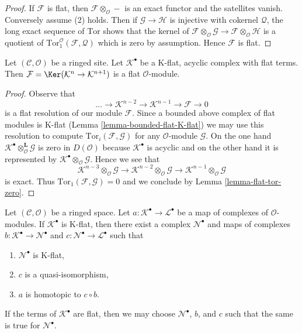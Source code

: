 \begin{proof}
If $\mathcal{F}$ is flat, then $\mathcal{F} \otimes_\mathcal{O} -$
is an exact functor and the satellites vanish. Conversely assume (2)
holds. Then if $\mathcal{G} \to \mathcal{H}$ is injective with cokernel
$\mathcal{Q}$, the long exact sequence of $\text{Tor}$ shows that
the kernel of
$\mathcal{F} \otimes_\mathcal{O} \mathcal{G} \to
\mathcal{F} \otimes_\mathcal{O} \mathcal{H}$
is a quotient of
$\text{Tor}_1^\mathcal{O}(\mathcal{F}, \mathcal{Q})$
which is zero by assumption. Hence $\mathcal{F}$ is flat.
\end{proof}

\begin{lemma}
\label{lemma-K-flat-flat-acyclic}
Let $(\mathcal{C}, \mathcal{O})$ be a ringed site. Let $\mathcal{K}^\bullet$
be a K-flat, acyclic complex with flat terms. Then
$\mathcal{F} = \Ker(\mathcal{K}^n \to \mathcal{K}^{n + 1})$
is a flat $\mathcal{O}$-module.
\end{lemma}

\begin{proof}
Observe that
$$
\ldots \to \mathcal{K}^{n - 2} \to \mathcal{K}^{n - 1} \to
\mathcal{F} \to 0
$$
is a flat resolution of our module $\mathcal{F}$. Since a bounded above complex
of flat modules is K-flat (Lemma \ref{lemma-bounded-flat-K-flat})
we may use this resolution to compute
$\text{Tor}_i(\mathcal{F}, \mathcal{G})$ for any
$\mathcal{O}$-module $\mathcal{G}$. On the one hand
$\mathcal{K}^\bullet \otimes_\mathcal{O}^\mathbf{L} \mathcal{G}$
is zero in $D(\mathcal{O})$ because $\mathcal{K}^\bullet$ is acyclic
and on the other hand it is represented by
$\mathcal{K}^\bullet \otimes_\mathcal{O} \mathcal{G}$.
Hence we see that
$$
\mathcal{K}^{n - 3} \otimes_\mathcal{O} \mathcal{G} \to
\mathcal{K}^{n - 2} \otimes_\mathcal{O} \mathcal{G} \to
\mathcal{K}^{n - 1} \otimes_\mathcal{O} \mathcal{G}
$$
is exact. Thus $\text{Tor}_1(\mathcal{F}, \mathcal{G}) = 0$
and we conclude by Lemma \ref{lemma-flat-tor-zero}.
\end{proof}

\begin{lemma}
\label{lemma-factor-through-K-flat}
Let $(\mathcal{C}, \mathcal{O})$ be a ringed space.
Let $a : \mathcal{K}^\bullet \to \mathcal{L}^\bullet$ be a map of complexes
of $\mathcal{O}$-modules. If $\mathcal{K}^\bullet$ is K-flat, then
there exist a complex $\mathcal{N}^\bullet$ and maps of complexes
$b : \mathcal{K}^\bullet \to \mathcal{N}^\bullet$
and $c : \mathcal{N}^\bullet \to \mathcal{L}^\bullet$ such that
\begin{enumerate}
\item $\mathcal{N}^\bullet$ is K-flat,
\item $c$ is a quasi-isomorphism,
\item $a$ is homotopic to $c \circ b$.
\end{enumerate}
If the terms of $\mathcal{K}^\bullet$ are flat, then we may choose
$\mathcal{N}^\bullet$, $b$, and $c$
such that the same is true for $\mathcal{N}^\bullet$.
\end{lemma}

